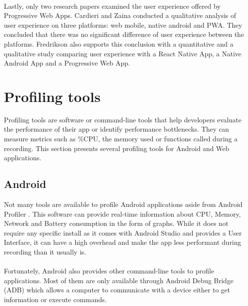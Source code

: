 \documentclass{kththesis}
\begin{document}
\paragraph{}
Lastly, only two research papers examined the user experience offered by Progressive Web Apps. Cardieri and Zaina \cite{PWA_UX_comparison_study} conducted a qualitative analysis of user experience on three platforms: web mobile, native android and PWA. They concluded that there was no significant difference of user experience between the platforms. Fredrikson \cite{emulating_native_w_crossplatform} also supports this conclusion with a quantitative and a qualitative study comparing user experience with a React Native App, a Native Android App and a Progressive Web App. 

\section{Profiling tools}

Profiling tools are software or command-line tools that help developers evaluate the performance of their app or identify performance bottlenecks. They can measure metrics such as \%CPU, the memory used or functions called during a recording.
This section presents several profiling tools for Android and Web applications.



\subsection{Android}

Not many tools are available to profile Android applications aside from Android Profiler \cite{nanoscope}. This software can provide real-time information about CPU, Memory, Network and Battery consumption in the form of graphs. While it does not require any specific install as it comes with Android Studio and provides a User Interface, it can have a high overhead \cite{nanoscope} and make the app less performant during recording than it usually is. 

\paragraph{}
Fortunately, Android also provides other command-line tools to profile applications. Most of them are only available through Android Debug Bridge (ADB) \cite{adb} which allows a computer to communicate with a device either to get information or execute commands. 
\end{document}
